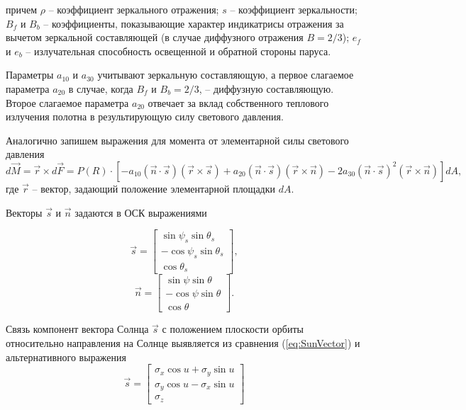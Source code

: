 причем $\rho$ -- коэффициент зеркального отражения; $s$ -- коэффициент зеркальности;
$B_f$ и $B_b$ -- коэффициенты, показывающие характер индикатрисы отражения за вычетом
зеркальной составляющей (в случае диффузного отражения $B = 2/3$); $e_f$ и $e_b$ --
излучательная способность освещенной и обратной стороны паруса.\par
  Параметры $a_{10}$ и $a_{30}$ учитывают зеркальную составляющую, а первое слагаемое
параметра $a_{20}$ в случае, когда $B_f$ и $B_b = 2/3$, -- диффузную составляющую.
Второе слагаемое параметра $a_{20}$ отвечает за вклад собственного теплового излучения
полотна в результирующую силу светового давления.\par
  Аналогично запишем выражения для момента от элементарной силы светового давления
\begin{equation}
  d\vec{M} = \vec{r} \times d\vec{F} = P(R) \cdot \left[
    -a_{10}(\vec{n}\cdot\vec{s})(\vec{r} \times \vec{s})
    +a_{20}(\vec{n}\cdot\vec{s})(\vec{r} \times \vec{n})
    -2a_{30}(\vec{n}\cdot\vec{s})^2(\vec{r} \times \vec{n})
  \right]dA,
\end{equation}
где $\vec{r}$ -- вектор, задающий положение элементарной площадки $dA$.\par
  Векторы $\vec{s}$ и $\vec{n}$ задаются в ОСК выражениями\par
\begin{equation} \label{eq:SunVector}
  \vec{s} = \begin{bmatrix}
     \sin\psi_s\sin\theta_s \\
    -\cos\psi_s\sin\theta_s \\
     \cos\theta_s
  \end{bmatrix},
\end{equation}
\begin{equation}
  \vec{n} = \begin{bmatrix}
     \sin\psi\sin\theta \\
    -\cos\psi\sin\theta \\
     \cos\theta
  \end{bmatrix}.
\end{equation}\par
Связь компонент вектора Солнца $\vec{s}$ с положением плоскости орбиты относительно
направления на Солнце выявляется из сравнения (\ref{eq:SunVector}) и альтернативного
выражения
\begin{equation}
  \vec{s} = \begin{bmatrix}
    \sigma_x\cos u + \sigma_y\sin u \\
    \sigma_y\cos u - \sigma_x\sin u \\
    \sigma_z
  \end{bmatrix}
\end{equation}
